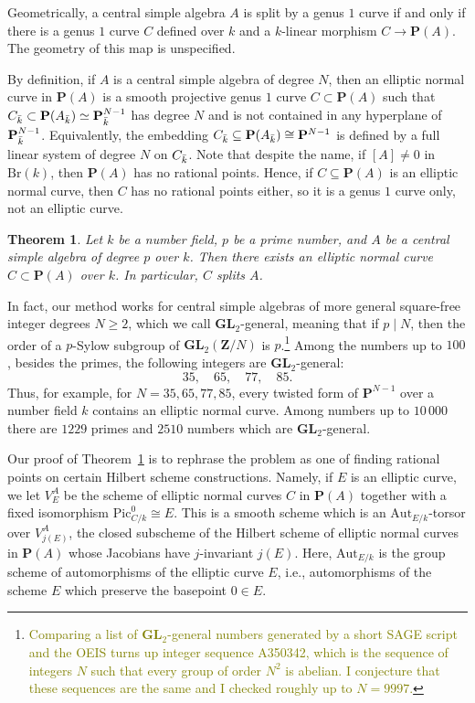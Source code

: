 \documentclass[10pt,letterpaper,twoside]{article}
\newcommand{\BA}[1]{\textcolor{olive}{#1}}
\renewcommand{\1}{\mathbf{1}}
\newcommand{\bP}{\mathbf{P}}
\newcommand{\bZ}{\mathbf{Z}}
\newcommand{\Aut}{\mathrm{Aut}}
\renewcommand{\geq}{\geqslant}
\newcommand{\GL}{\mathbf{GL}}
\newcommand{\Pic}{\mathrm{Pic}}
\newcommand{\Br}{\mathrm{Br}}
\newcommand{\iso}{\cong}
\theoremstyle{plain}
\newtheorem{theorem}{Theorem}[section]
\theoremstyle{plain}
\theoremstyle{definition}
\theoremstyle{named}
\theoremstyle{definition}
\begin{document}
	Geometrically, a central simple algebra $A$ is split by a genus $1$ curve if and only if there is a genus $1$ curve $C$
	defined over $k$ and a $k$-linear morphism $C\rightarrow\bP(A)$. The geometry of this map is
	unspecified.
	
	By definition, if $A$ is a central simple algebra of degree $N$, then an elliptic normal curve in $\bP(A)$ is a
	smooth projective genus $1$ curve $C\subset \bP(A)$ such that $C_{\Bar{k}}\subset
	\bP(A_{\Bar{k}})\simeq \bP_{\Bar{k}}^{N-1}$ has degree $N$ and is not contained in any hyperplane of
	$\bP_{\Bar{k}}^{N-1}$.
	Equivalently, the embedding
	$C_{\Bar{k}}\subseteq\bP(A_{\Bar{k}})\iso\bP^{N-1}$ is defined by a full linear system of degree $N$
	on $C_{\Bar{k}}$. Note that despite the name, if $[A]\neq 0$ in $\Br(k)$, then $\bP(A)$ has no
	rational points. Hence, if $C\subseteq\bP(A)$ is an elliptic normal curve, then $C$ has no rational points either, so it is a
	genus $1$ curve only, not an elliptic curve.
	
	\begin{theorem}\label{mainthm}
		Let $k$ be a number field, $p$ be a prime number, and $A$ be a central simple algebra of degree
		$p$ over $k$. Then there exists an elliptic normal curve $C\subset \bP(A)$ over $k$. In
		particular, $C$ splits $A$.
	\end{theorem}
	
	In fact, our method works for central simple algebras of more general square-free integer degrees
	$N\geq 2$, which we
	call $\GL_2$-general, meaning that if $p\;|\;N$, then the order of a $p$-Sylow subgroup of
	$\GL_2(\bZ/N)$ is $p$.\footnote{\BA{Comparing a list of $\GL_2$-general numbers generated by a short
			{\ttfamily SAGE} script and the {\ttfamily OEIS} turns up integer sequence {\ttfamily A350342},
			which is the sequence of integers $N$ such that every group of order $N^2$ is abelian. I conjecture
			that these sequences are the same and I checked roughly up to $N=9997$.}} Among the numbers up to $100$, besides the primes, the following integers are
	$\GL_2$-general:
	$$35,\quad 65,\quad 77,\quad 85.$$
	Thus, for example, for $N=35,65,77,85$, every twisted form of $\bP^{N-1}$ over a number field $k$ contains an
	elliptic normal curve. Among numbers up to $10\,000$ there are $1229$ primes and $2510$ numbers which
	are $\GL_2$-general.
	
	Our proof of Theorem~\ref{mainthm} is to rephrase the problem as one of finding rational points on
	certain Hilbert scheme constructions. Namely, if $E$ is an elliptic curve, we let $V_E^A$ be the scheme of elliptic normal curves
	$C$ in $\bP(A)$ together with a fixed isomorphism $\Pic_{C/k}^0\iso E$.
	This is a smooth scheme which is an $\Aut_{E/k}$-torsor over $V_{j(E)}^A$, the closed subscheme of the
	Hilbert scheme of elliptic normal curves in $\bP(A)$ whose Jacobians have $j$-invariant $j(E)$.
	Here, $\Aut_{E/k}$ is the group scheme of automorphisms of the elliptic curve $E$, i.e.,
	automorphisms of the scheme $E$ which preserve the basepoint $0\in E$.
	
\end{document}
